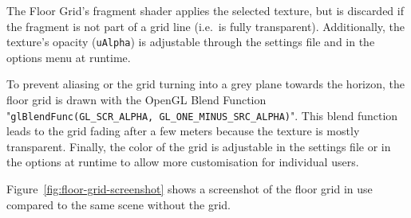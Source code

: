 The Floor Grid's fragment shader applies the selected texture, but is discarded if the fragment is not part of a grid
line (i.e.\ is fully transparent).
Additionally, the texture's opacity (\texttt{uAlpha}) is adjustable through the settings file and
in the options menu at runtime.

To prevent aliasing or the grid turning into a grey plane towards the horizon, the floor grid is drawn with the
OpenGL Blend Function "\texttt{glBlendFunc(GL_SCR_ALPHA, GL_ONE_MINUS_SRC_ALPHA)}".
This blend function leads to the grid fading after a few meters because the texture is mostly transparent.
Finally, the color of the grid is adjustable in the settings file or in the options at runtime to allow more
customisation for individual users.

Figure~\ref{fig:floor-grid-screenshot} shows a screenshot of the floor grid in use compared to the same scene without
the grid.
